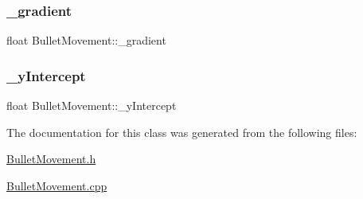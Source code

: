 \mbox{\label{class_bullet_movement_a21abb8a9b6d5d1d6cd5e079648ade529}} 
\subsubsection{\texorpdfstring{\+\_\+gradient}{\_gradient}}
{\footnotesize\ttfamily float Bullet\+Movement\+::\+\_\+gradient\hspace{0.3cm}{\ttfamily [private]}}

\mbox{\label{class_bullet_movement_a8d20043e5da44b2585b78e0be9d9ad66}} 
\subsubsection{\texorpdfstring{\+\_\+y\+Intercept}{\_yIntercept}}
{\footnotesize\ttfamily float Bullet\+Movement\+::\+\_\+y\+Intercept\hspace{0.3cm}{\ttfamily [private]}}



The documentation for this class was generated from the following files\+:\begin{DoxyCompactItemize}
\item 
\hyperlink{_bullet_movement_8h}{Bullet\+Movement.\+h}\item 
\hyperlink{_bullet_movement_8cpp}{Bullet\+Movement.\+cpp}\end{DoxyCompactItemize}
